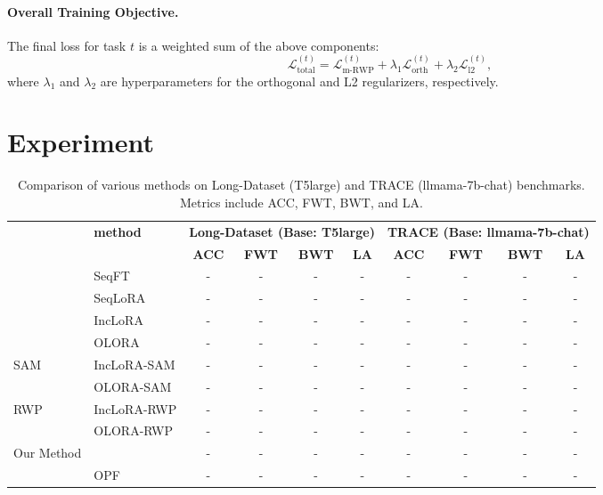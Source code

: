 \documentclass[letterpaper]{article} %
\begin{document}
\paragraph{Overall Training Objective.}
The final loss for task $t$ is a weighted sum of the above components:
\begin{equation}
\label{eq:full_loss}
\mathcal{L}_{\text{total}}^{(t)} = \mathcal{L}_{\mathrm{m\text{-}RWP}}^{(t)} + \lambda_1 \mathcal{L}_{\text{orth}}^{(t)} + \lambda_2 \mathcal{L}_{\text{l2}}^{(t)},
\end{equation}
where $\lambda_1$ and $\lambda_2$ are hyperparameters for the orthogonal and L2 regularizers, respectively.








\section{Experiment}


\begin{table}[thbp]
\centering
\begin{tabular}{llcccccccc}
\toprule
 & \multirow{2}{*}{\textbf{method}} 
    & \multicolumn{4}{c}{\textbf{Long-Dataset (Base: T5large)}} 
    & \multicolumn{4}{c}{\textbf{TRACE (Base: llmama-7b-chat)}} \\
\cmidrule(lr){3-6} \cmidrule(lr){7-10}
 & & \textbf{ACC} & \textbf{FWT} & \textbf{BWT} & \textbf{LA}
   & \textbf{ACC} & \textbf{FWT} & \textbf{BWT} & \textbf{LA} \\
\midrule
\multirow{4}{*}{} 
    & SeqFT       & - & - & - & - & - & - & - & - \\
    & SeqLoRA     & - & - & - & - & - & - & - & - \\
    & IncLoRA     & - & - & - & - & - & - & - & - \\
    & OLORA       & - & - & - & - & - & - & - & - \\
\midrule
\multirow{2}{*}{SAM} 
    & IncLoRA-SAM & - & - & - & - & - & - & - & - \\
    & OLORA-SAM   & - & - & - & - & - & - & - & - \\
\midrule
\multirow{2}{*}{RWP} 
    & IncLoRA-RWP & - & - & - & - & - & - & - & - \\
    & OLORA-RWP   & - & - & - & - & - & - & - & - \\
\midrule
\multirow{2}{*}{Our Method} 
    &             & - & - & - & - & - & - & - & - \\
    & OPF         & - & - & - & - & - & - & - & - \\
\bottomrule
\end{tabular}
\caption{Comparison of various methods on Long-Dataset (T5large) and TRACE (llmama-7b-chat) benchmarks. Metrics include ACC, FWT, BWT, and LA.}
\label{tab:main_cl_benchmark}
\end{table}
\end{document}
